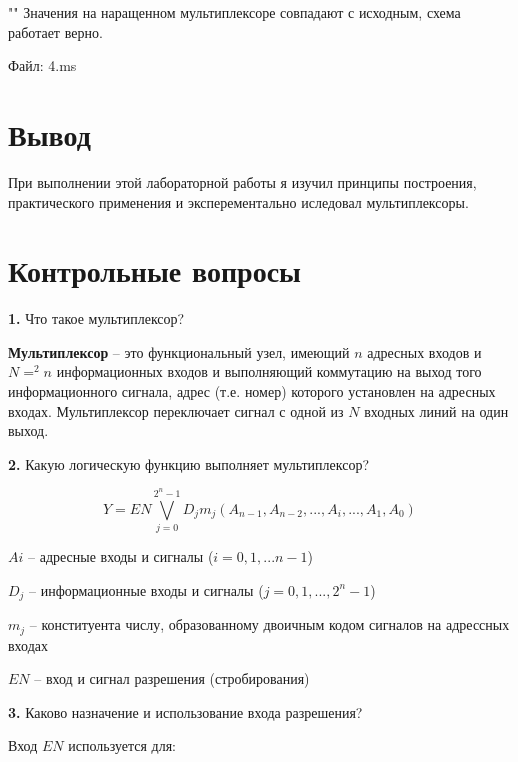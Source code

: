 \documentclass[a4paper,12pt]{article}
\begin{document}
""\newline\newline
\noindent Значения на наращенном мультиплексоре совпадают с исходным, схема работает верно.\newline

\noindent Файл: 4.ms\newline

\section{Вывод}

\noindent При выполнении этой лабораторной работы я изучил принципы построения, практического применения и эксперементально иследовал мультиплексоры.

\section{Контрольные вопросы}

\noindent\textbf{1.} Что такое мультиплексор?\newline

\noindent\textbf{Мультиплексор} -- это функциональный узел, имеющий $n$ адресных входов и $N=^2n$ информационных входов и выполняющий коммутацию на выход того информационного сигнала, адрес (т.е. номер) которого установлен на адресных входах. Мультиплексор переключает сигнал с одной из $N$ входных линий на один выход.
\newline

\noindent\textbf{2.} Какую логическую функцию выполняет мультиплексор? \newline

\noindent
$$ Y = EN \bigvee\limits_{j=0}^{2^n - 1} D_{j} m_{j}(A_{n-1}, A_{n - 2}, ... , A_{i}, ... , A_{1}, A_{0})$$

\noindent $A{i}$ -- адресные входы и сигналы ($i =0, 1, ... n - 1$)

\noindent $D_{j}$ -- информационные входы и сигналы ($j = 0, 1, ..., 2^n-1$)

\noindent $m_{j}$ -- конституента числу, образованному двоичным кодом сигналов на адрессных входах

\noindent $EN$ -- вход и сигнал разрешения (стробирования)\newline

\noindent\textbf{3.} Каково назначение и использование входа разрешения?\newline

\noindent Вход $EN$ используется для:\newline
\end{document}
